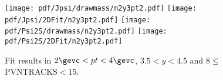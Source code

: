 \begin{figure}[H]
\begin{center}
\texttt{[image: pdf/Jpsi/drawmass/n2y3pt2.pdf]}
\texttt{[image: pdf/Jpsi/2DFit/n2y3pt2.pdf]}
\vspace*{-0.5cm}
\texttt{[image: pdf/Psi2S/drawmass/n2y3pt2.pdf]}
\texttt{[image: pdf/Psi2S/2DFit/n2y3pt2.pdf]}
\vspace*{-0.5cm}
\end{center}
\caption{Fit results in $2\gevc<pt<4\gevc$, $3.5<y<4.5$ and 8$\leq$PVNTRACKS$<$15.}
\label{Fitn2y3pt2}
\end{figure}
